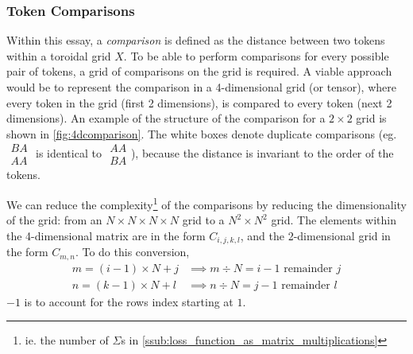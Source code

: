 \subsubsection{Token Comparisons}%
\label{ssub:token_comparisons}
Within this essay, a \emph{comparison} is defined as the distance between two tokens within a toroidal grid $X$. To be able to perform comparisons for every possible pair of tokens, a grid of comparisons on the grid is required. A viable approach would be to represent the comparison in a 4-dimensional grid (or tensor), where every token in the grid (first 2 dimensions), is compared to every token (next 2 dimensions). An example of the structure of the comparison for a $2\times 2$ grid is shown in \autoref{fig:4dcomparison}. The white boxes denote duplicate comparisons (eg. $
\begin{smallmatrix}
    BA\\ AA
\end{smallmatrix}
$ is identical to
$
\begin{smallmatrix}
    AA\\ BA
\end{smallmatrix}
$), because the distance is invariant to the order of the tokens.

We can reduce the complexity\footnote{ie. the number of $\Sigma$s in \ref{ssub:loss_function_as_matrix_multiplications}} of the comparisons by reducing the dimensionality of the grid: from an $N\times N\times N\times N$ grid to a $N^2\times N^2$ grid. The elements within the 4-dimensional matrix are in the form $C_{i,j,k,l}$, and the 2-dimensional grid in the form $C_{m,n}$. To do this conversion,
\begin{align*}
    m=(i-1)\times N+j &\implies m\div N=i-1 \text{ remainder } j\\
    n=(k-1)\times N+l &\implies n\div N=j-1 \text{ remainder } l
\end{align*}
$-1$ is to account for the rows index starting at $1$.

